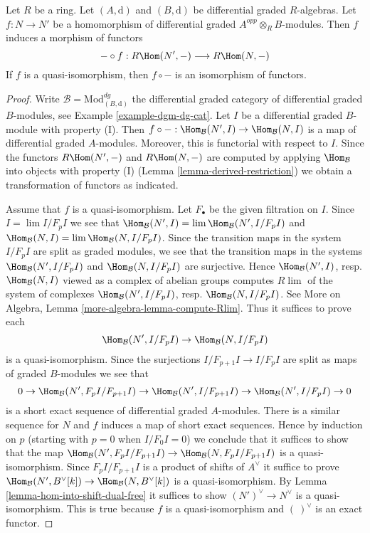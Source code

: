 \begin{lemma}
\label{lemma-functoriality-derived-restriction}
Let $R$ be a ring. Let $(A, \text{d})$ and $(B, \text{d})$ be
differential graded $R$-algebras. Let $f : N \to N'$ be a
homomorphism of differential graded $A^{opp} \otimes_R B$-modules.
Then $f$ induces a morphism of functors
$$
- \circ f : R\Hom(N', -) \longrightarrow R\Hom(N, -)
$$
If $f$ is a quasi-isomorphism, then $f \circ -$ is an isomorphism of
functors.
\end{lemma}

\begin{proof}
Write $\mathcal{B} = \text{Mod}^{dg}_{(B, \text{d})}$ the
differential graded category of differential graded $B$-modules, see
Example \ref{example-dgm-dg-cat}.
Let $I$ be a differential graded $B$-module with property (I).
Then $f \circ - : \Hom_\mathcal{B}(N', I) \to \Hom_\mathcal{B}(N, I)$
is a map of differential graded $A$-modules. Moreover, this is functorial
with respect to $I$. Since the functors
$ R\Hom(N', -)$ and $R\Hom(N, -)$ are
computed by applying $\Hom_\mathcal{B}$ into objects with property (I)
(Lemma \ref{lemma-derived-restriction}) we obtain a transformation of functors
as indicated.

\medskip\noindent
Assume that $f$ is a quasi-isomorphism. Let $F_\bullet$ be the
given filtration on $I$. Since $I = \lim I/F_pI$ we see that
$\Hom_\mathcal{B}(N', I) = \lim \Hom_\mathcal{B}(N', I/F_pI)$ and
$\Hom_\mathcal{B}(N, I) = \lim \Hom_\mathcal{B}(N, I/F_pI)$.
Since the transition maps in the system $I/F_pI$ are split
as graded modules, we see that the transition maps in the
systems $\Hom_\mathcal{B}(N', I/F_pI)$ and $\Hom_\mathcal{B}(N, I/F_pI)$
are surjective. Hence $\Hom_\mathcal{B}(N', I)$, resp. $\Hom_\mathcal{B}(N, I)$
viewed as a complex of abelian groups computes $R\lim$ of the system
of complexes
$\Hom_\mathcal{B}(N', I/F_pI)$, resp. $\Hom_\mathcal{B}(N, I/F_pI)$.
See More on Algebra, Lemma \ref{more-algebra-lemma-compute-Rlim}.
Thus it suffices to prove each
$$
\Hom_\mathcal{B}(N', I/F_pI) \to \Hom_\mathcal{B}(N, I/F_pI)
$$
is a quasi-isomorphism. Since the surjections $I/F_{p + 1}I \to I/F_pI$
are split as maps of graded $B$-modules we see that
$$
0 \to \Hom_\mathcal{B}(N', F_pI/F_{p + 1}I) \to
\Hom_\mathcal{B}(N', I/F_{p + 1}I) \to
\Hom_\mathcal{B}(N', I/F_pI) \to 0
$$
is a short exact sequence of differential graded $A$-modules.
There is a similar sequence for $N$ and $f$ induces a map
of short exact sequences. Hence by induction on $p$ (starting with $p = 0$
when $I/F_0I = 0$) we conclude that it suffices to show that
the map
$\Hom_\mathcal{B}(N', F_pI/F_{p + 1}I) \to \Hom_\mathcal{B}(N, F_pI/F_{p + 1}I)$
is a quasi-isomorphism. Since $F_pI/F_{p + 1}I$ is a product of shifts of
$A^\vee$ it suffice to prove
$\Hom_\mathcal{B}(N', B^\vee[k]) \to \Hom_\mathcal{B}(N, B^\vee[k])$
is a quasi-isomorphism. By Lemma \ref{lemma-hom-into-shift-dual-free}
it suffices to show $(N')^\vee \to N^\vee$ is a quasi-isomorphism.
This is true because $f$ is a quasi-isomorphism and $(\ )^\vee$
is an exact functor.
\end{proof}

